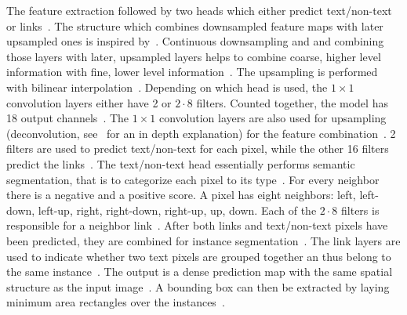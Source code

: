 The feature extraction followed by two heads which either predict text/non-text or
links~\citep{deng_pixellink_2018}.
The structure which combines downsampled feature maps with later upsampled ones is inspired
by~\cite{long_fully_2015}.
Continuous downsampling and and combining those layers with later, upsampled layers helps
to combine coarse, higher level information with fine, lower level
information~\citep{long_fully_2015}.
The upsampling is performed with bilinear interpolation~\citep{deng_pixellink_2018}.
Depending on which head is used, the $1\times1$ convolution layers either have 2 or $2\cdot8$ filters.
Counted together, the model has 18 output channels~\citep{deng_pixellink_2018}.
The $1\times1$ convolution layers are also used for upsampling (deconvolution,
see~\cite{noh_learning_2015,long_fully_2015} for an in depth explanation)
for the feature combination~\citep{deng_pixellink_2018}.
2 filters are used to predict text/non-text for each pixel, while the other 16 filters predict
the links~\citep{deng_pixellink_2018}.
The text/non-text head essentially performs semantic segmentation, that is to categorize each
pixel to its type~\citep{deng_pixellink_2018}.
For every neighbor there is a negative and a positive score.
A pixel has eight neighbors: left, left-down, left-up, right, right-down, right-up, up, down.
Each of the $2\cdot8$ filters is responsible for a neighbor link~\citep{deng_pixellink_2018}.
After both links and text/non-text pixels have been predicted, they are combined for instance
segmentation~\citep{deng_pixellink_2018}.
The link layers are used to indicate whether two text pixels are grouped together an thus belong to
the same instance~\citep{deng_pixellink_2018}.
The output is a dense prediction map with the same spatial structure as the input
image~\citep{deng_pixellink_2018}.
A bounding box can then be extracted by laying minimum area rectangles over the
instances~\citep{deng_pixellink_2018}.

